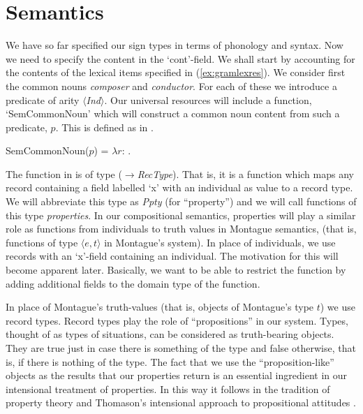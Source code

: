  
\section{Semantics}
We have so far specified our sign types in terms of phonology and
syntax.  Now we need to specify the content in the `cont'-field.  We
shall start by accounting for the contents of the lexical items
specified in (\ref{ex:gramlexres}).  We consider first the common
nouns \textit{composer} and \textit{conductor}.  For each of these we
introduce a predicate of arity $\langle$\textit{Ind}$\rangle$.  Our universal resources will include a function,
`SemCommonNoun' which will construct a common noun content from such a
predicate, $p$.  This is defined as in \nexteg{}.
\begin{ex} 
SemCommonNoun($p$) = $\lambda
r$: .  
\end{ex} 
The function in \preveg{} is of type
($\rightarrow$\textit{RecType}).
That is, it is a function which maps any record containing a field
labelled `x' with an individual as value to a record type.  We will
abbreviate this type as \textit{Ppty} (for ``property'') and we will
call functions of this type \textit{properties}.  In our compositional
semantics, properties will play a similar role as functions from
individuals to truth values  in Montague
semantics, (that is, functions of type $\langle e,t\rangle$ in
Montague's system).  In place of individuals, we use records with an `x'-field
containing an individual.  The motivation for this will become
apparent later. Basically, we want to be
able to restrict the function by adding additional fields to the
domain type of the function.

In place of Montague's truth-values (that is, objects of
Montague's type $t$) we use record types.  Record types play the role
of ``propositions'' in our system.  Types, thought of as types of
situations, can be considered as truth-bearing objects.  They are true
just in case there is something of the type and false otherwise, that
is, if there is
nothing of the type.  The fact that we use the ``proposition-like''
objects as the results that our properties return is an essential
ingredient in our intensional treatment of properties.  In this way it
follows in the tradition of property theory
\citep{ChierchiaTurner1988,FoxLappin2005}  and Thomason's intensional
approach to propositional attitudes \citep{Thomason1980}.

